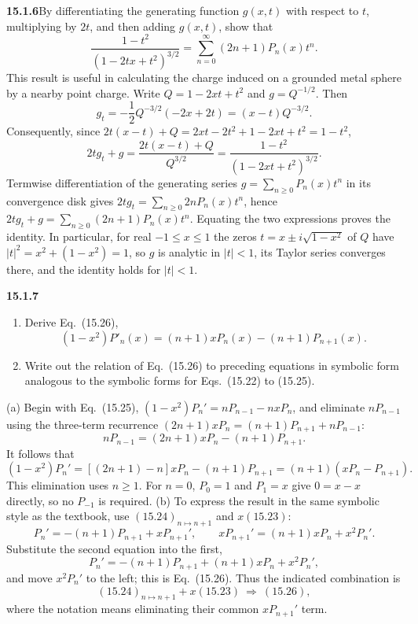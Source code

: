 \par\bigskip
\noindent\textbf{15.1.6}\quad By differentiating the generating
function $g(x,t)$ with respect to $t$, multiplying by $2t$, and then
adding $g(x,t)$, show that 
\[
\frac{1-t^{2}}{(1-2tx+t^{2})^{3/2}}
=\sum_{n=0}^{\infty}(2n+1)P_{n}(x)t^{n}.
\]
This result is useful in calculating the charge induced on a grounded
metal sphere by a nearby point charge.
\solution
Write $Q=1-2xt+t^2$ and $g=Q^{-1/2}$. Then
\[
g_t=-\frac12Q^{-3/2}(-2x+2t)=(x-t)Q^{-3/2}.
\]
Consequently, since $2t(x-t)+Q=2xt-2t^2+1-2xt+t^2=1-t^2$,
\[
2tg_t+g
=\frac{2t(x-t)+Q}{Q^{3/2}}
=\frac{1-t^2}{(1-2xt+t^2)^{3/2}}.
\]
Termwise differentiation of the generating series
$g=\sum_{n\ge0}P_n(x)t^n$ in its convergence disk gives
$2tg_t=\sum_{n\ge0}2nP_n(x)t^n$, hence
$2tg_t+g=\sum_{n\ge0}(2n+1)P_n(x)t^n$.
Equating the two expressions proves the identity. In particular,
for real $-1\le x\le1$ the zeros $t=x\pm i\sqrt{1-x^2}$ of $Q$ have
$|t|^2=x^2+(1-x^2)=1$, so $g$ is analytic in $|t|<1$, its Taylor
series converges there, and the identity holds for $|t|<1$.

\par\bigskip
\noindent\textbf{15.1.7}
\begin{enumerate}
\item[(a)] Derive Eq.~(15.26),
\[
(1-x^{2})P'_{n}(x)=(n+1)xP_{n}(x)-(n+1)P_{n+1}(x).
\]
\item[(b)] Write out the relation of Eq.~(15.26) to preceding
equations in symbolic form analogous to the symbolic forms for
Eqs.~(15.22) to (15.25).
\end{enumerate}
\solution
(a) Begin with Eq.~(15.25), $(1-x^2)P_n'=nP_{n-1}-nxP_n$, and
eliminate $nP_{n-1}$ using the three-term recurrence
$(2n+1)xP_n=(n+1)P_{n+1}+nP_{n-1}$:
\[
nP_{n-1}=(2n+1)xP_n-(n+1)P_{n+1}.
\]
It follows that
\[
(1-x^2)P_n'=[(2n+1)-n]xP_n-(n+1)P_{n+1}
=\boxed{(n+1)(xP_n-P_{n+1})}.
\]
This elimination uses $n\ge1$. For $n=0$, $P_0=1$ and $P_1=x$
give $0=x-x$ directly, so no $P_{-1}$ is required.
(b) To express the result in the same symbolic style as the textbook,
use $(15.24)_{n\mapsto n+1}$ and $x(15.23)$:
\[
P_n'=-(n+1)P_{n+1}+xP_{n+1}',\qquad
xP_{n+1}'=(n+1)xP_n+x^2P_n'.
\]
Substitute the second equation into the first,
\[
P_n'=-(n+1)P_{n+1}+(n+1)xP_n+x^2P_n',
\]
and move $x^2P_n'$ to the left; this is Eq.~(15.26).
Thus the indicated combination is
\[
\boxed{(15.24)_{n\mapsto n+1}+x(15.23)\ \Longrightarrow\ (15.26)},
\]
where the notation means eliminating their common $xP_{n+1}'$ term.

